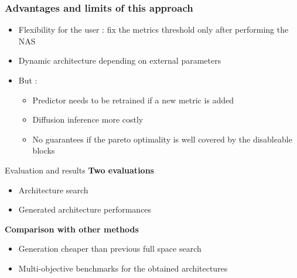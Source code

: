 \documentclass[aspectratio=169,xcolor=dvipsnames]{beamer}
\begin{document}

\begin{frame}
    \frametitle{Advantages and limits of this approach}
    \begin{itemize}
        \item Flexibility for the user : fix the metrics threshold only after performing the NAS
        \item Dynamic architecture depending on external parameters
        \item But :
              \begin{itemize}
                  \item Predictor needs to be retrained if a new metric is added
                  \item Diffusion inference more costly
                  \item No guarantees if the pareto optimality is well covered by the disableable blocks
              \end{itemize}
    \end{itemize}
\end{frame}

\begin{frame}{Evaluation and results}
    \textbf{Two evaluations}
    \begin{itemize}
        \item Architecture search
        \item Generated architecture performances
    \end{itemize}

    \textbf{Comparison with other methods}
    \begin{itemize}
        \item Generation cheaper than previous full space search
        \item Multi-objective benchmarks for the obtained architectures
    \end{itemize}
\end{frame}
\end{document}
